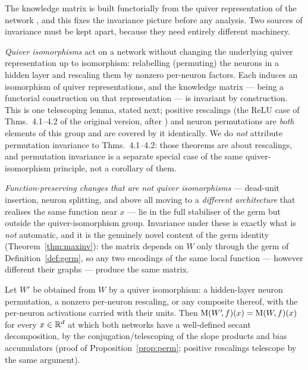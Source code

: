 The knowledge matrix is built functorially from the quiver representation of
the network \citep{armenta2021representation,armenta2022double}, and this fixes
the invariance picture before any analysis. Two sources of invariance must be
kept apart, because they need entirely different machinery.

\emph{Quiver isomorphisms} act on a network without changing the underlying
quiver representation up to isomorphism: relabelling (permuting) the neurons in
a hidden layer and rescaling them by nonzero per-neuron factors. Each induces
an isomorphism of quiver representations, and the knowledge matrix --- being a
functorial construction on that representation --- is invariant by
construction. This is one telescoping lemma, stated next; positive rescalings
(the ReLU case of Thms.~4.1--4.2 of the original version, after
\citealp{armenta2021representation}) and neuron permutations are \emph{both}
elements of this group and are covered by it identically. We do \emph{not}
attribute permutation invariance to Thms.~4.1--4.2: those theorems are about
rescalings, and permutation invariance is a separate special case of the same
quiver-isomorphism principle, not a corollary of them.

\emph{Function-preserving changes that are not quiver isomorphisms} --- dead-unit
insertion, neuron splitting, and above all moving to a \emph{different
architecture} that realises the same function near $x$ --- lie in the full
stabiliser of the germ but outside the quiver-isomorphism group. Invariance
under these is exactly what is \emph{not} automatic, and it is the genuinely
novel content of the germ identity (Theorem~\ref{thm:maxinv}): the matrix
depends on $W$ only through the germ of Definition~\ref{def:germ}, so any
two encodings of the same local function --- however different their graphs ---
produce the same matrix.

\begin{lemma}\label{lem:quiver-inv}
Let $W'$ be obtained from $W$ by a quiver isomorphism: a hidden-layer
neuron permutation, a nonzero per-neuron rescaling, or any composite thereof,
with the per-neuron activations carried with their units. Then
$\mathrm{M}(W'\!,f)(x)=\mathrm{M}(W\!,f)(x)$ for every $x\in\mathbb{R}^d$ at which both networks have a
well-defined secant decomposition, by the conjugation/telescoping of the slope
products and bias accumulators (proof of Proposition~\ref{prop:perm}; positive
rescalings telescope by the same argument).
\end{lemma}

